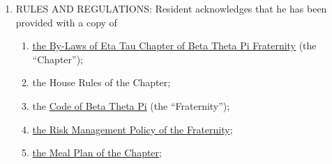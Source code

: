 \documentclass[legalpaper, 12pt]{article}
\begin{document}
\begin{enumerate}
\begin{enumerate}[label=\Alph*.]
                \end{enumerate}

        \item\label{itm:rules} RULES AND REGULATIONS\@: Resident acknowledges
                that he has been provided with a copy of 

        \begin{enumerate}[label=\arabic*)]

                \item
                        \href{https://docs.google.com/document/d/19zC4bDC3ZrdCWqLJ8Y0Z35mJEEDPLed1o6GGvX5XCGw/edit?usp=sharing}
                        {the By-Laws of Eta Tau Chapter of Beta Theta Pi
                        Fraternity} (the ``Chapter''); 

                \item the House Rules of the Chapter; 

                \item the
                        \href{https://beta.org/wp-content/uploads/2020/08/Code-of-Beta-Theta-Pi_08.13.2020.pdf}{Code
                        of Beta Theta Pi} (the ``Fraternity'');

                \item
                        \href{https://beta.org/wp-content/uploads/2020/08/Beta-Theta-Pi-Risk-Management-Policy-August-2020.pdf}{the
                        Risk Management Policy of the Fraternity};

                \item
                        \href{https://docs.google.com/document/d/1TNQDLowFoC3HZo6kSRtdvaxXrOXnMxME0UXYeSga4I8/edit?usp=sharing}{the
                        Meal Plan of the Chapter};

        \end{enumerate}


\end{enumerate}
\end{document}
